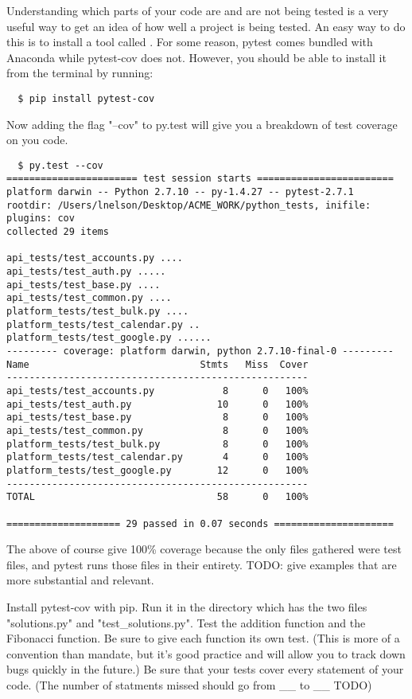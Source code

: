Understanding which parts of your code are and are not being tested is a very useful way to get an idea of how well a project is being tested.
An easy way to do this is to install a tool called . For some reason, pytest comes bundled with Anaconda while pytest-cov does not.  However, you should be able to install it from the terminal by running:
\begin{lstlisting}
  $ pip install pytest-cov
\end{lstlisting}
Now adding the flag "--cov" to py.test will give you a breakdown of test coverage on you code.
\begin{lstlisting}
  $ py.test --cov
======================= test session starts ========================
platform darwin -- Python 2.7.10 -- py-1.4.27 -- pytest-2.7.1
rootdir: /Users/lnelson/Desktop/ACME_WORK/python_tests, inifile:
plugins: cov
collected 29 items

api_tests/test_accounts.py ....
api_tests/test_auth.py .....
api_tests/test_base.py ....
api_tests/test_common.py ....
platform_tests/test_bulk.py ....
platform_tests/test_calendar.py ..
platform_tests/test_google.py ......
--------- coverage: platform darwin, python 2.7.10-final-0 ---------
Name                              Stmts   Miss  Cover
-----------------------------------------------------
api_tests/test_accounts.py            8      0   100%
api_tests/test_auth.py               10      0   100%
api_tests/test_base.py                8      0   100%
api_tests/test_common.py              8      0   100%
platform_tests/test_bulk.py           8      0   100%
platform_tests/test_calendar.py       4      0   100%
platform_tests/test_google.py        12      0   100%
-----------------------------------------------------
TOTAL                                58      0   100%

==================== 29 passed in 0.07 seconds =====================
\end{lstlisting}

The above of course give 100\% coverage because the only files gathered were test files, and pytest runs those files in their entirety.  TODO: give examples that are more substantial and relevant.

\begin{problem}
Install pytest-cov with pip.
Run it in the directory which has the two files "solutions.py" and "test\_solutions.py".
Test the addition function and the Fibonacci function. Be sure to give each function its own test. (This is more of a convention than mandate,
but it's good practice and will allow you to track down bugs quickly in the future.) Be sure that your tests cover every statement of your code.
(The number of statments missed should go from \_\_ to \_\_ TODO)
\end{problem}

